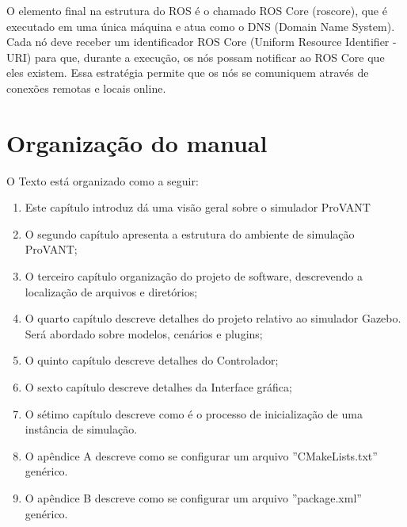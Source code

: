 O elemento final na estrutura do ROS é o chamado ROS Core (roscore), que é executado em uma única máquina e atua como o DNS (Domain Name System). Cada nó deve receber um identificador ROS Core (Uniform Resource Identifier - URI) para que, durante a execução, os nós possam notificar ao ROS Core que eles existem. Essa estratégia permite que os nós se comuniquem através de conexões remotas e locais online.

\section{Organização do manual}

O Texto está organizado como a seguir:

\begin{enumerate}
	\item Este capítulo introduz dá uma visão geral sobre o simulador ProVANT
	\item O segundo capítulo apresenta a estrutura do ambiente de simulação ProVANT;
	\item O terceiro capítulo organização do projeto de software, descrevendo a localização de arquivos e diretórios;
	\item O quarto capítulo descreve detalhes do projeto relativo ao simulador Gazebo. Será abordado sobre modelos, cenários e plugins;
	\item O quinto capítulo descreve detalhes do Controlador;
	\item O sexto capítulo descreve detalhes da Interface gráfica;
	\item O sétimo capítulo descreve como é o processo de inicialização de uma instância de simulação.
	\item O apêndice A descreve como se configurar um arquivo ''CMakeLists.txt'' genérico.
	\item O apêndice B descreve como se configurar um arquivo ''package.xml'' genérico.
\end{enumerate}




